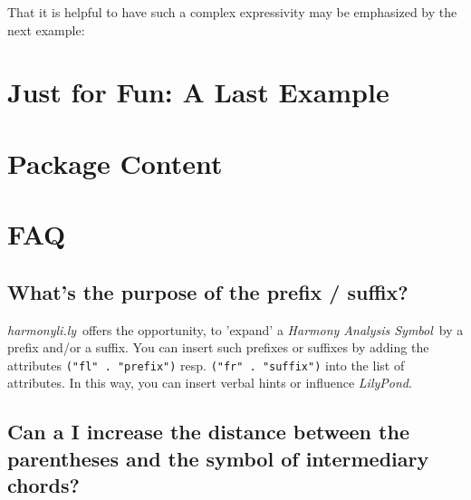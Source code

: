 \documentclass[
  DIV=calc,
  BCOR=5mm,
  12pt,
  headings=small,
  oneside,
  abstract=true,
  toc=bib,
  xcolor=dvipsnames,
  openany,
  ngerman,english]{scrartcl}
\newcommand{\hlyn}[0]{\textit{harmonyli.ly}}
\newcommand{\lily}[0]{\textit{LilyPond}}
\newcommand{\has}[1]{\textit{Harmony Analysis Symbol#1}}
\begin{document}
That it is helpful to have such a complex expressivity may be emphasized by the
next example:

\begin{center}
\end{center}

\section{Just for Fun: A Last Example}

\section{Package Content}

\section{FAQ}
\label{FAQ}
\subsection{What's the purpose of the prefix / suffix?}

\hlyn\ offers the opportunity, to 'expand' a \has{}\ by a prefix and/or a
suffix. You can insert such prefixes or suffixes by adding the attributes
\texttt{("fl" . "prefix")} resp. \texttt{("fr" . "suffix")} into the list of
attributes. In this way, you can insert verbal hints or influence \lily.

\subsection{Can a I increase the distance between the parentheses and the symbol of intermediary chords?}
\end{document}
